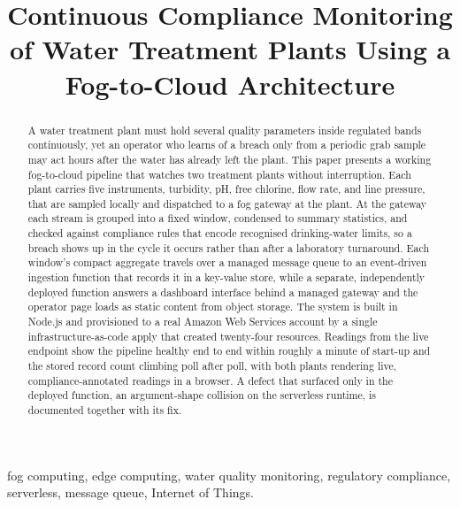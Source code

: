 \documentclass[conference]{IEEEtran}
\begin{document}
\title{Continuous Compliance Monitoring of Water Treatment Plants Using a Fog-to-Cloud Architecture}

\author{
}

\maketitle

\begin{abstract}
A water treatment plant must hold several quality parameters inside regulated bands continuously, yet an operator who learns of a breach only from a periodic grab sample may act hours after the water has already left the plant. This paper presents a working fog-to-cloud pipeline that watches two treatment plants without interruption. Each plant carries five instruments, turbidity, pH, free chlorine, flow rate, and line pressure, that are sampled locally and dispatched to a fog gateway at the plant. At the gateway each stream is grouped into a fixed window, condensed to summary statistics, and checked against compliance rules that encode recognised drinking-water limits, so a breach shows up in the cycle it occurs rather than after a laboratory turnaround. Each window's compact aggregate travels over a managed message queue to an event-driven ingestion function that records it in a key-value store, while a separate, independently deployed function answers a dashboard interface behind a managed gateway and the operator page loads as static content from object storage. The system is built in Node.js and provisioned to a real Amazon Web Services account by a single infrastructure-as-code apply that created twenty-four resources. Readings from the live endpoint show the pipeline healthy end to end within roughly a minute of start-up and the stored record count climbing poll after poll, with both plants rendering live, compliance-annotated readings in a browser. A defect that surfaced only in the deployed function, an argument-shape collision on the serverless runtime, is documented together with its fix.
\end{abstract}

\begin{IEEEkeywords}
fog computing, edge computing, water quality monitoring, regulatory compliance, serverless, message queue, Internet of Things.
\end{IEEEkeywords}
\end{document}
